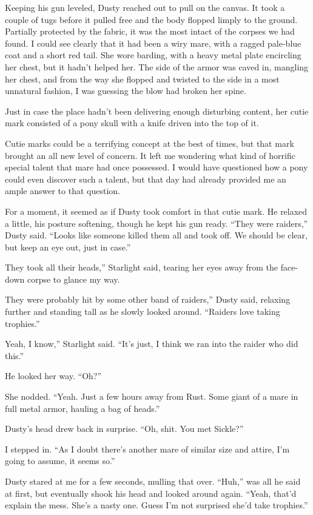 Keeping his gun leveled, Dusty reached out to pull on the canvas. It took a couple of tugs before it pulled free and the body flopped limply to the ground. Partially protected by the fabric, it was the most intact of the corpses we had found. I could see clearly that it had been a wiry mare, with a ragged pale-blue coat and a short red tail. She wore barding, with a heavy metal plate encircling her chest, but it hadn’t helped her. The side of the armor was caved in, mangling her chest, and from the way she flopped and twisted to the side in a most unnatural fashion, I was guessing the blow had broken her spine.

Just in case the place hadn’t been delivering enough disturbing content, her cutie mark consisted of a pony skull with a knife driven into the top of it.

Cutie marks could be a terrifying concept at the best of times, but that mark brought an all new level of concern. It left me wondering what kind of horrific special talent that mare had once possessed. I would have questioned how a pony could even discover such a talent, but that day had already provided me an ample answer to that question.

For a moment, it seemed as if Dusty took comfort in that cutie mark. He relaxed a little, his posture softening, though he kept his gun ready. “They were raiders,” Dusty said. “Looks like someone killed them all and took off. We should be clear, but keep an eye out, just in case.”

\leavevmode{}They took all their heads,” Starlight said, tearing her eyes away from the face-down corpse to glance my way.

\leavevmode{}They were probably hit by some other band of raiders,” Dusty said, relaxing further and standing tall as he slowly looked around. “Raiders love taking trophies.”

\leavevmode{}Yeah, I know,” Starlight said. “It’s just, I think we ran into the raider who did this.”

He looked her way. “Oh?”

She nodded. “Yeah. Just a few hours away from Rust. Some giant of a mare in full metal armor, hauling a bag of heads.”

Dusty’s head drew back in surprise. “Oh, shit. You met Sickle?”

I stepped in. “As I doubt there’s another mare of similar size and attire, I’m going to assume, it seems so.”

Dusty stared at me for a few seconds, mulling that over. “Huh,” was all he said at first, but eventually shook his head and looked around again. “Yeah, that’d explain the mess. She’s a nasty one. Guess I’m not surprised she’d take trophies.”

